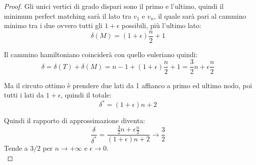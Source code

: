 \documentclass[11pt]{article}
\begin{document}
\begin{proof}
		Gli unici vertici di grado dispari sono il primo e l'ultimo, quindi il minimum perfect matching sarà il lato tra $v_1$ e $v_n$, il quale sarà pari al cammino minimo tra i due ovvero tutti gli $1 + \epsilon$ possibili, più l'ultimo lato:
		$$ \delta(M) = (1 + \epsilon) \frac{n}{2} + 1$$
		
		Il cammino hamiltoniano coinciderà con quello euleriano quindi:
		$$ \delta = \delta (T) + \delta (M) = n-1 + (1 + \epsilon) \frac{n}{2} + 1 = \frac{3}{2} n + \epsilon \frac{n}{2} $$
		
		Ma il circuto ottimo è prendere due lati da 1 affianco a primo ed ultimo nodo, poi tutti i lati da $1 + \epsilon$, quindi il totale: 
		$$ \delta^\ast = (1+ \epsilon)n + 2 $$
		
		Quindi il rapporto di approssimazione diventa: 
		$$ \frac{\delta}{\delta^\ast} = \frac{\frac{3}{2}n + \epsilon \frac{n}{2}}{ (1 + \epsilon) n + 2} \rightarrow \frac{3}{2}$$
		Tende a $3/2$ per $n \rightarrow +\infty$ e $\epsilon \rightarrow 0$.\\
	\end{proof}
	
	\newpage
	
	
	
\end{document}
